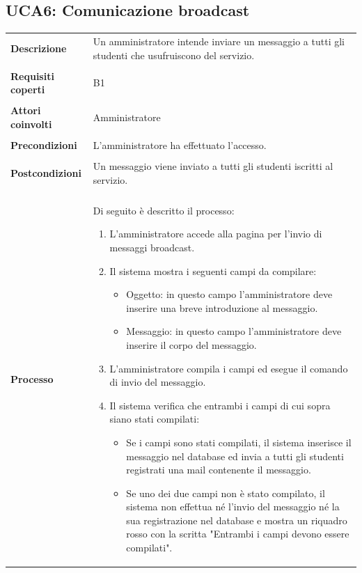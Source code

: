 \documentclass[10pt,a4paper]{report}
\begin{document}
	\subsection{UCA6: Comunicazione broadcast}
	\begin{tabular}{lp{}}
		\textbf{Descrizione}&Un amministratore intende inviare un messaggio a tutti gli studenti che usufruiscono del servizio.\\
		\\
		\textbf{Requisiti coperti}&B1\\
		\\
		\textbf{Attori coinvolti}&Amministratore\\
		\\
		\textbf{Precondizioni}&L'amministratore ha effettuato l'accesso.\\
		\\
		\textbf{Postcondizioni}&Un messaggio viene inviato a tutti gli studenti iscritti al servizio.\\
		\\
		\textbf{Processo}&Di seguito è descritto il processo:
		\begin{enumerate}
			\item L'amministratore accede alla pagina per l'invio di messaggi broadcast.
			\item Il sistema mostra i seguenti campi da compilare:
			\begin{itemize}
				\item Oggetto: in questo campo l'amministratore deve inserire una breve introduzione al messaggio.
				\item Messaggio: in questo campo l'amministratore deve inserire il corpo del messaggio.
			\end{itemize}
			\item L'amministratore compila i campi ed esegue il comando di invio del messaggio.
			\item Il sistema verifica che entrambi i campi di cui sopra siano stati compilati:
			\begin{itemize}
				\item Se i campi sono stati compilati, il sistema inserisce il messaggio nel database ed invia a tutti gli studenti registrati una mail contenente il messaggio.
				\item Se uno dei due campi non è stato compilato, il sistema non effettua né l'invio del messaggio né la sua registrazione nel database e mostra un riquadro rosso con la scritta "Entrambi i campi devono essere compilati".
			\end{itemize}
		\end{enumerate}
	\end{tabular}
	
\end{document}
